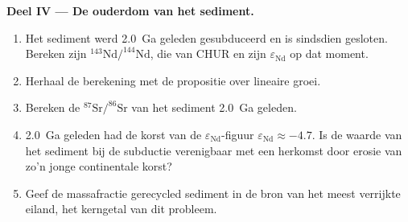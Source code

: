 \begin{problem}
\noindent\textbf{Deel IV --- De ouderdom van het sediment.}
\begin{enumerate}[resume]
\item Het sediment werd \qty{2.0}{Ga} geleden gesubduceerd en is sindsdien gesloten.
Bereken zijn $^{143}\mathrm{Nd}/^{144}\mathrm{Nd}$, die van CHUR en zijn
$\varepsilon_{\mathrm{Nd}}$ op dat moment.
\item Herhaal de berekening met de propositie over lineaire groei.
\item Bereken de $^{87}\mathrm{Sr}/^{86}\mathrm{Sr}$ van het sediment \qty{2.0}{Ga} geleden.
\item \qty{2.0}{Ga} geleden had de korst van de $\varepsilon_{\mathrm{Nd}}$-figuur
$\varepsilon_{\mathrm{Nd}} \approx -4.7$. Is de waarde van het sediment bij de subductie verenigbaar
met een herkomst door erosie van zo'n jonge continentale korst?
\item Geef de massafractie gerecycled sediment in de bron van het meest
verrijkte eiland, het kerngetal van dit probleem.
\end{enumerate}
\end{problem}
